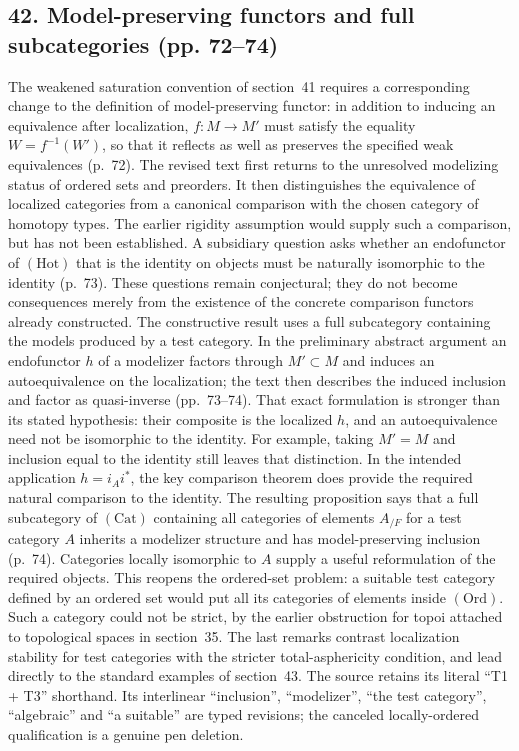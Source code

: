 \documentclass[10pt,oneside]{book}
\begin{document}
\subsection*{42. Model-preserving functors and full subcategories (pp. 72--74)}
The weakened saturation convention of section~41 requires a corresponding change to the definition of model-preserving functor: in addition to inducing an equivalence after localization, $f:M\to M'$ must satisfy the equality $W=f^{-1}(W')$, so that it reflects as well as preserves the specified weak equivalences (p.~72). The revised text first returns to the unresolved modelizing status of ordered sets and preorders. It then distinguishes the equivalence of localized categories from a canonical comparison with the chosen category of homotopy types. The earlier rigidity assumption would supply such a comparison, but has not been established. A subsidiary question asks whether an endofunctor of $(\mathrm{Hot})$ that is the identity on objects must be naturally isomorphic to the identity (p.~73). These questions remain conjectural; they do not become consequences merely from the existence of the concrete comparison functors already constructed. The constructive result uses a full subcategory containing the models produced by a test category. In the preliminary abstract argument an endofunctor $h$ of a modelizer factors through $M'\subset M$ and induces an autoequivalence on the localization; the text then describes the induced inclusion and factor as quasi-inverse (pp.~73--74). That exact formulation is stronger than its stated hypothesis: their composite is the localized $h$, and an autoequivalence need not be isomorphic to the identity. For example, taking $M'=M$ and inclusion equal to the identity still leaves that distinction. In the intended application $h=i_Ai^*$, the key comparison theorem does provide the required natural comparison to the identity. The resulting proposition says that a full subcategory of $(\mathrm{Cat})$ containing all categories of elements $A_{/F}$ for a test category $A$ inherits a modelizer structure and has model-preserving inclusion (p.~74). Categories locally isomorphic to $A$ supply a useful reformulation of the required objects. This reopens the ordered-set problem: a suitable test category defined by an ordered set would put all its categories of elements inside $(\mathrm{Ord})$. Such a category could not be strict, by the earlier obstruction for topoi attached to topological spaces in section~35. The last remarks contrast localization stability for test categories with the stricter total-asphericity condition, and lead directly to the standard examples of section~43. The source retains its literal ``T1 + T3'' shorthand. Its interlinear ``inclusion'', ``modelizer'', ``the test category'', ``algebraic'' and ``a suitable'' are typed revisions; the canceled locally-ordered qualification is a genuine pen deletion.
\end{document}
